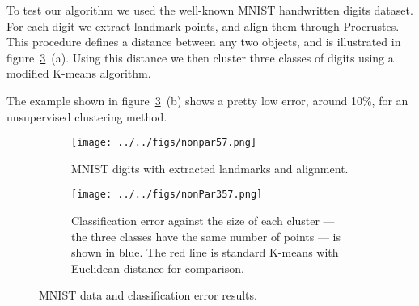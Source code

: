 \documentclass[simplex.tex]{subfiles}
\begin{document}
To test our algorithm we used the well-known MNIST handwritten digits
dataset. For each digit we extract landmark points, and align them
through Procrustes. This procedure defines a distance between any two
objects, and is illustrated in figure~\ref{fig:nonpar}~(a). Using this
distance we then cluster three classes of digits using a modified
K-means algorithm. 

The example shown in figure~\ref{fig:nonpar}~(b)
shows a pretty low error, around 10\%, for an unsupervised clustering
method.

\begin{figure}[h!]
\begin{cframed}
\centering

\begin{subfigure}[t]{0.45\textwidth}
\texttt{[image: ../../figs/nonpar57.png]}
\label{fig:nonpar57}
\caption{
  MNIST digits with extracted landmarks and alignment.
  }
\end{subfigure}
\begin{subfigure}[t]{0.45\textwidth}
\texttt{[image: ../../figs/nonPar357.png]}
\label{fig:nonpar357}
\caption{
Classification error against the size of each
cluster --- the three classes have the same number of points --- is
shown in blue. The red line is standard
K-means with Euclidean distance for comparison.   }
\end{subfigure}
\caption{
  MNIST data and classification error results.
}
\label{fig:nonpar}
\end{cframed}
\end{figure}
\end{document}

